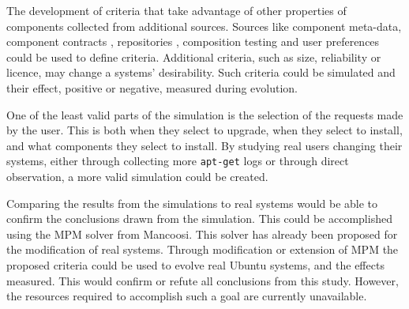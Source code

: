 The development of criteria that take advantage of other properties of components collected from additional sources.
Sources like component meta-data, component contracts \citep{Watkins1999}, repositories \citep{Guo2000}, 
composition testing \citep{XuejieZhang2008} and user preferences could be used to define criteria.
Additional criteria, such as size, reliability or licence, may change a systems' desirability.
Such criteria could be simulated and their effect, positive or negative, measured during evolution.

One of the least valid parts of the simulation is the selection of the requests made by the user.
This is both when they select to upgrade, when they select to install, and what components they select to install.
By studying real users changing their systems, either through collecting more \texttt{apt-get} logs or through direct observation,
a more valid simulation could be created.

Comparing the results from the simulations to real systems would be able to confirm the conclusions drawn from the simulation.
This could be accomplished using the MPM solver \citep{abate2011} from Mancoosi.
This solver has already been proposed for the modification of real systems.
Through modification or extension of MPM the proposed criteria could be used to evolve real Ubuntu systems, and the effects measured.  
This would confirm or refute all conclusions from this study.
However, the resources required to accomplish such a goal are currently unavailable.   

